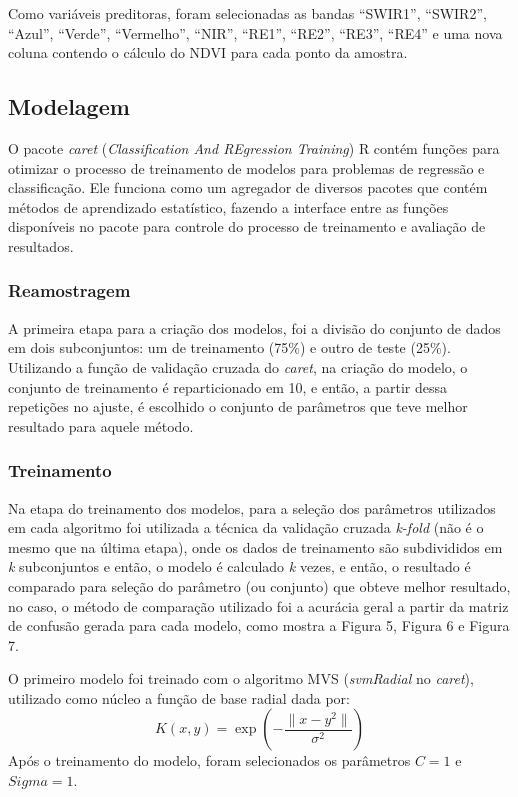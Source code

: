 	Como variáveis preditoras, foram selecionadas as bandas ``SWIR1'',
``SWIR2'', ``Azul'', ``Verde'', ``Vermelho'', ``NIR'', ``RE1'', ``RE2'',
``RE3'', ``RE4'' e uma nova coluna contendo o cálculo do NDVI para cada
ponto da amostra.


\subsection{Modelagem}\label{modelagem}

	O pacote \emph{caret} (\emph{Classification And REgression Training}) \cite{caret} R contém funções para otimizar o processo de treinamento de modelos para problemas de regressão e classificação. Ele funciona como um agregador de diversos pacotes que contém métodos de aprendizado estatístico, fazendo a interface entre as funções disponíveis no pacote para controle do processo de treinamento e avaliação de resultados.

\subsubsection{Reamostragem}\label{reamostragem}

	A primeira etapa para a criação dos modelos, foi a divisão do conjunto
de dados em dois subconjuntos: um de treinamento (75\%) e outro de teste (25\%). Utilizando a função de validação cruzada do \emph{caret}, na criação do modelo, o conjunto de treinamento é reparticionado em 10, e então, a partir dessa repetições no ajuste, é escolhido o conjunto de
parâmetros que teve melhor resultado para aquele método.

\subsubsection{Treinamento}\label{treinamento}

	Na etapa do treinamento dos modelos, para a seleção dos parâmetros
utilizados em cada algoritmo foi utilizada a técnica da validação
cruzada \emph{k-fold} (não é o mesmo que na última etapa), onde os dados de treinamento são subdivididos em \emph{k} subconjuntos e então, o modelo é calculado \emph{k} vezes, e então, o resultado é comparado para seleção do parâmetro (ou conjunto) que obteve melhor resultado, no caso, o método de comparação utilizado foi a acurácia geral a partir da matriz de confusão gerada para cada modelo, como mostra a Figura 5, Figura 6 e Figura 7.

	O primeiro modelo foi treinado com o algoritmo MVS (\emph{svmRadial} no \emph{caret}), utilizado como núcleo a função de base radial dada por: 
    \begin{equation}
	K(x,y) = \exp(-\frac{\parallel x-y^{2} \parallel}{\sigma^{2}})    
    \end{equation}
	Após o treinamento do modelo, foram selecionados os parâmetros $C = 1$ e $Sigma = 1$.
    
